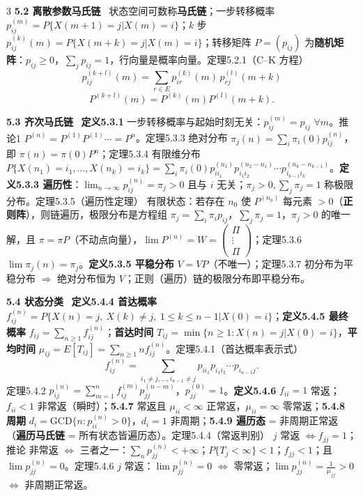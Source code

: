 \documentclass[UTF8,a4paper]{ctexart}
\newcommand{\T}[1]{{\bfseries #1}\ }
\newcommand{\B}[1]{\textbf{#1}}
\newcommand{\Hi}[1]{\textcolor{red!70!black}{#1}}
\begin{document}
\begin{multicols}{3}
\T{5.2 离散参数马氏链} 状态空间可数称\B{马氏链}；一步转移概率 $p_{ij}^{(m)}=P\{X(m+1)=j|X(m)=i\}$；$k$ 步 $p_{ij}^{(k)}(m)=P\{X(m+k)=j|X(m)=i\}$；转移矩阵 $P=(p_{ij})$ 为\B{随机矩阵}：$p_{ij}\ge0$，$\sum_jp_{ij}=1$，行向量是概率向量。\Hi{定理5.2.1（C--K 方程）}
$$p_{ij}^{(k+l)}(m)=\sum_{r\in E}p_{ir}^{(k)}(m)\,p_{rj}^{(l)}(m+k)$$$$P^{(k+l)}(m)=P^{(k)}(m)P^{(l)}(m+k).$$

\T{5.3 齐次马氏链} \B{定义5.3.1} 一步转移概率与起始时刻无关：$p_{ij}^{(m)}=p_{ij}$ $\forall m$。\Hi{推论1 $P^{(n)}=P^{(1)}P^{(1)}\cdots=P^n$}。\Hi{定理5.3.3} 绝对分布 $\pi_j(n)=\sum_i\pi_i(0)p_{ij}^{(n)}$，即 $\pi(n)=\pi(0)P^n$；\Hi{定理5.3.4} 有限维分布 $P\{X(n_1)=i_1,\dots,X(n_k)=i_k\}=\sum_i\pi_i(0)p_{ii_1}^{(n_1)}p_{i_1i_2}^{(n_2-n_1)}\cdots p_{i_{k-1}i_k}^{(n_k-n_{k-1})}$。\B{定义5.3.3 遍历性}：$\lim_{n\to\infty}p_{ij}^{(n)}=\pi_j>0$ 且与 $i$ 无关；$\pi_j>0,\sum_j\pi_j=1$ 称极限分布。\Hi{定理5.3.5（遍历性定理）} 有限状态：若存在 $n_0$ 使 $P^{(n_0)}$ 每元素 $>0$（\B{正则阵}），则链遍历，极限分布是方程组 $\pi_j=\sum_i\pi_ip_{ij}$，$\sum_j\pi_j=1$，$\pi_j>0$ 的唯一解，且 $\pi=\pi P$（不动点向量），$\lim P^{(n)}=W=\begin{pmatrix}\Pi\\\vdots\\\Pi\end{pmatrix}$；\Hi{定理5.3.6} $\lim\pi_j(n)=\pi_j$。\B{定义5.3.5 平稳分布} $V=VP$（不唯一）；\Hi{定理5.3.7} 初分布为平稳分布 $\Rightarrow$ 绝对分布恒为 $V$；正则（遍历）链的极限分布即平稳分布。

\T{5.4 状态分类} \B{定义5.4.4 首达概率} $f_{ij}^{(n)}=P\{X(n)=j,\ X(k)\ne j,\ 1\le k\le n-1|X(0)=i\}$；\B{定义5.4.5 最终概率} $f_{ij}=\sum_{n\ge1}f_{ij}^{(n)}$；\B{首达时间} $T_{ij}=\min\{n\ge1:X(n)=j|X(0)=i\}$，\B{平均时间} $\mu_{ij}=E[T_{ij}]=\sum_{n\ge1}n f_{ij}^{(n)}$。\Hi{定理5.4.1（首达概率表示式）}
$$f_{ij}^{(n)}=\sum_{i_1\ne j,\dots,i_{n-1}\ne j}p_{ii_1}p_{i_1i_2}\cdots p_{i_{n-1}j}.$$
\Hi{定理5.4.2} $p_{ij}^{(n)}=\sum_{m=1}^nf_{ij}^{(m)}p_{jj}^{(n-m)}$，$p_{jj}^{(0)}=1$。\B{定义5.4.6} $f_{ii}=1$ 常返；$f_{ii}<1$ 非常返（瞬时）；\B{5.4.7} 常返且 $\mu_{ii}<\infty$ 正常返，$\mu_{ii}=\infty$ 零常返；\B{5.4.8 周期} $d_i=\mathrm{GCD}\{n:p_{ii}^{(n)}>0\}$，$d_i=1$ 非周期；\B{5.4.9 遍历态} = 非周期正常返（\B{遍历马氏链} = 所有状态皆遍历态）。\Hi{定理5.4.4（常返判别）} $j$ 常返 $\iff f_{jj}=1$；\Hi{推论} 非常返 $\iff$ 三者之一：$\sum_np_{jj}^{(n)}<+\infty$；$P\{T_j<\infty\}<1$；$f_{jj}<1$；且 $\lim p_{jj}^{(n)}=0$。\Hi{定理5.4.6} $j$ 常返：$\lim p_{jj}^{(n)}=0$ $\iff$ 零常返；$\lim p_{jj}^{(n)}=\frac1{\mu_{jj}}>0$ $\iff$ 非周期正常返。


\end{multicols}
\end{document}
